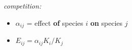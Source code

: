 \textsl{competition:}
\begin{itemize}
\item $\alpha_{ij}$ = effect \textbf{of} species $i$ \textbf{on} species $j$
\item $E_{ij} = \alpha_{ij} K_i/K_j$
\end{itemize}
